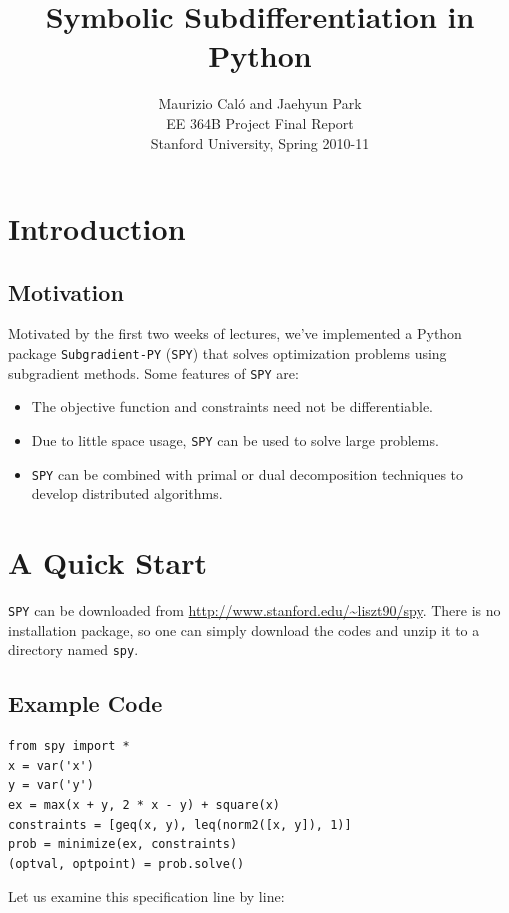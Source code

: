 \documentclass[12pt]{article}
\title{Symbolic Subdifferentiation in Python}
\author{Maurizio Cal\'o and Jaehyun Park\\
EE 364B Project Final Report\\
Stanford University, Spring 2010-11}
\begin{document}
\maketitle

\section{Introduction}
\subsection{Motivation}
Motivated by the first two weeks of lectures, we've implemented a
Python package \verb'Subgradient-PY' (\verb'SPY') that solves
optimization problems using subgradient methods. Some features of \verb'SPY' are:

\begin{itemize}
\item The objective function and constraints need not be differentiable.
\item Due to little space usage, \verb'SPY' can be used to solve large problems.
\item \verb'SPY' can be combined with primal or dual decomposition techniques to develop distributed algorithms.
\end{itemize}


\section{A Quick Start}
\verb'SPY' can be downloaded from \url{http://www.stanford.edu/~liszt90/spy}. There is no installation package, so one can simply download the codes and unzip it to a directory named \verb'spy'.

\subsection{Example Code}
\begin{verbatim}
from spy import *
x = var('x')
y = var('y')
ex = max(x + y, 2 * x - y) + square(x)
constraints = [geq(x, y), leq(norm2([x, y]), 1)]
prob = minimize(ex, constraints)
(optval, optpoint) = prob.solve()
\end{verbatim}

\noindent Let us examine this specification line by line:
\end{document}
